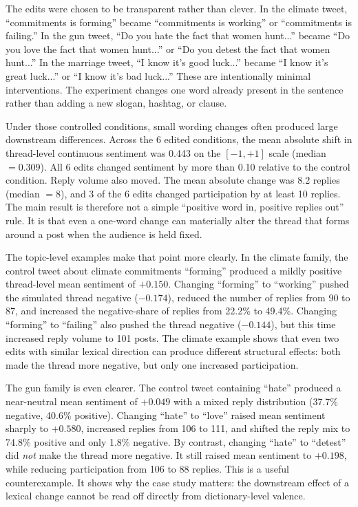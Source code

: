 \documentclass[logo,bsc,singlespacing,parskip,online]{infthesis}
\begin{document}
The edits were chosen to be transparent rather than clever. In the climate tweet, ``commitments is forming'' became ``commitments is working'' or ``commitments is failing.'' In the gun tweet, ``Do you hate the fact that women hunt...'' became ``Do you love the fact that women hunt...'' or ``Do you detest the fact that women hunt...'' In the marriage tweet, ``I know it's good luck...'' became ``I know it's great luck...'' or ``I know it's bad luck...'' These are intentionally minimal interventions. The experiment changes one word already present in the sentence rather than adding a new slogan, hashtag, or clause.

Under those controlled conditions, small wording changes often produced large downstream differences. Across the 6 edited conditions, the mean absolute shift in thread-level continuous sentiment was 0.443 on the $[-1, +1]$ scale (median $= 0.309$). All 6 edits changed sentiment by more than 0.10 relative to the control condition. Reply volume also moved. The mean absolute change was 8.2 replies (median $= 8$), and 3 of the 6 edits changed participation by at least 10 replies. The main result is therefore not a simple ``positive word in, positive replies out'' rule. It is that even a one-word change can materially alter the thread that forms around a post when the audience is held fixed.

The topic-level examples make that point more clearly. In the climate family, the control tweet about climate commitments ``forming'' produced a mildly positive thread-level mean sentiment of $+0.150$. Changing ``forming'' to ``working'' pushed the simulated thread negative ($-0.174$), reduced the number of replies from 90 to 87, and increased the negative-share of replies from 22.2\% to 49.4\%. Changing ``forming'' to ``failing'' also pushed the thread negative ($-0.144$), but this time increased reply volume to 101 posts. The climate example shows that even two edits with similar lexical direction can produce different structural effects: both made the thread more negative, but only one increased participation.

The gun family is even clearer. The control tweet containing ``hate'' produced a near-neutral mean sentiment of $+0.049$ with a mixed reply distribution (37.7\% negative, 40.6\% positive). Changing ``hate'' to ``love'' raised mean sentiment sharply to $+0.580$, increased replies from 106 to 111, and shifted the reply mix to 74.8\% positive and only 1.8\% negative. By contrast, changing ``hate'' to ``detest'' did \emph{not} make the thread more negative. It still raised mean sentiment to $+0.198$, while reducing participation from 106 to 88 replies. This is a useful counterexample. It shows why the case study matters: the downstream effect of a lexical change cannot be read off directly from dictionary-level valence.
\end{document}
